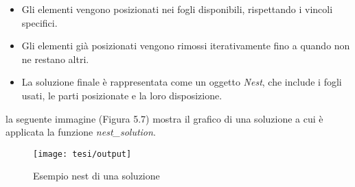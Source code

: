 \begin{itemize}
    \item Gli elementi vengono posizionati nei fogli disponibili, rispettando i vincoli specifici.
    \item Gli elementi già posizionati vengono rimossi iterativamente fino a quando non ne restano altri.
    \item La soluzione finale è rappresentata come un oggetto \emph{Nest}, che include i fogli usati, le parti posizionate e la loro disposizione.
\end{itemize}

la seguente immagine (Figura 5.7) mostra il grafico di una soluzione a cui è applicata la funzione \emph{nest\_solution}.

\begin{figure}[!ht] 
    \centering 
    \texttt{[image: tesi/output]} 
    \caption{Esempio nest di una soluzione}
\end{figure}















